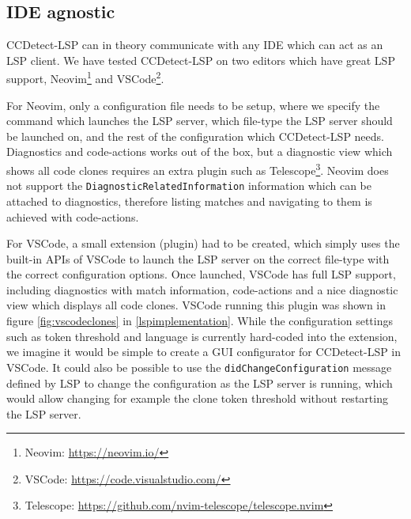 \subsection*{IDE agnostic}

CCDetect-LSP can in theory communicate with any IDE which can act as an LSP client. We
have tested CCDetect-LSP on two editors which have great LSP support,
Neovim\footnote{Neovim: \url{https://neovim.io/}} and VSCode\footnote{VSCode:
\url{https://code.visualstudio.com/}}. 

For Neovim, only a configuration file needs to be setup, where we specify the command
which launches the LSP server, which file-type the LSP server should be launched on, and
the rest of the configuration which CCDetect-LSP needs. Diagnostics and code-actions works
out of the box, but a diagnostic view which shows all code clones requires an extra plugin
such as Telescope\footnote{Telescope:
\url{https://github.com/nvim-telescope/telescope.nvim}}. Neovim does not support the
\verb|DiagnosticRelatedInformation| information which can be attached to diagnostics,
therefore listing matches and navigating to them is achieved with code-actions.

For VSCode, a small extension (plugin) had to be created, which simply uses the built-in
APIs of VSCode to launch the LSP server on the correct file-type with the correct
configuration options. Once launched, VSCode has full LSP support, including diagnostics
with match information, code-actions and a nice diagnostic view which displays all code
clones. VSCode running this plugin was shown in figure \ref{fig:vscodeclones} in
\cref{lspimplementation}. While the configuration settings such as token threshold and
language is currently hard-coded into the extension, we imagine it would be simple to
create a GUI configurator for CCDetect-LSP in VSCode. It could also be possible to use the
\verb|didChangeConfiguration| message defined by LSP to change the configuration as the
LSP server is running, which would allow changing for example the clone token threshold
without restarting the LSP server. 
